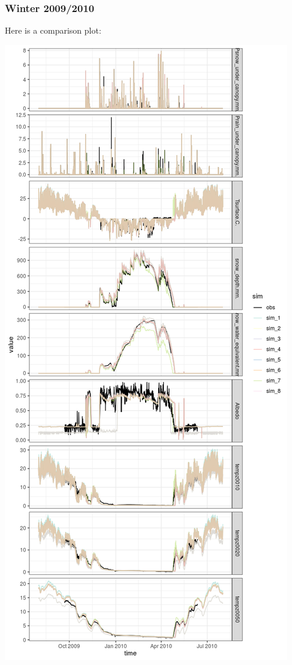 \documentclass[
]{article}
\begin{document}
\hypertarget{winter-20092010}{%
\subsubsection{Winter 2009/2010}\label{winter-20092010}}

Here is a comparison plot:

\includegraphics{coldelaporte_v6_files/figure-latex/Winter_2009_2010-1.png}
\end{document}
